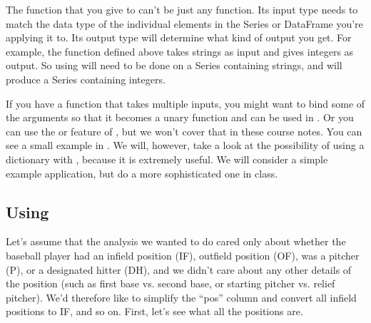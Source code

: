 \documentclass[letterpaper,10pt,english]{jupyterBook}
\begin{document}
\sphinxAtStartPar
The function that you give to  can’t be just any function.  Its input type needs to match the data type of the individual elements in the Series or DataFrame you’re applying it to.  Its output type will determine what kind of output you get.  For example, the  function defined above takes strings as input and gives integers as output.  So using  will need to be done on a Series containing strings, and will produce a Series containing integers.

\sphinxAtStartPar
If you have a function that takes multiple inputs, you might want to bind some of the arguments so that it becomes a unary function and can be used in .  Or you can use the  or  feature of , but we won’t cover that in these course notes.  You can see a small example in .  We will, however, take a look at the possibility of using a dictionary with , because it is extremely useful.  We will consider a simple example application, but do a more sophisticated one in class.


\subsection{Using }
\label{\detokenize{chapter-11-processing-rows:using-map}}
\sphinxAtStartPar
Let’s assume that the analysis we wanted to do cared only about whether the baseball player had an infield position (IF), outfield position (OF), was a pitcher (P), or a designated hitter (DH), and we didn’t care about any other details of the position (such as first base vs. second base, or starting pitcher vs. relief pitcher).  We’d therefore like to simplify the “pos” column and convert all infield positions to IF, and so on.  First, let’s see what all the positions are.

\begin{sphinxVerbatim}[commandchars=\\\{\}]
\PYG{p}{[}\PYG{p}{]}
\end{sphinxVerbatim}
\end{document}
